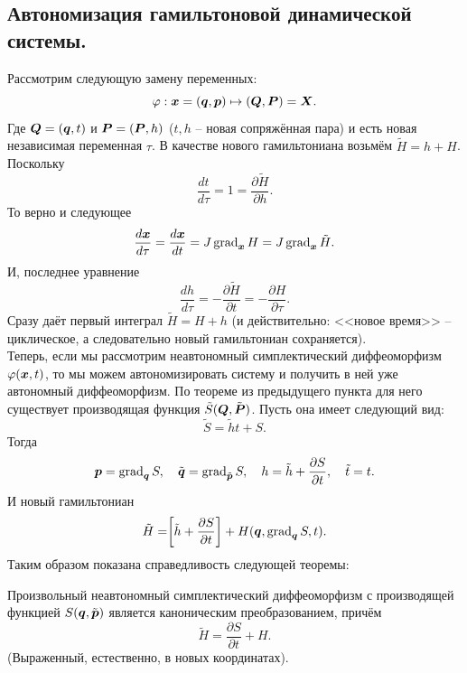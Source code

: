 \subsection{Автономизация гамильтоновой динамической системы.}
    Рассмотрим следующую замену переменных:
    \[
        \varphi: \boldsymbol{x} = (\boldsymbol{q}, \boldsymbol{p}) \mapsto (\boldsymbol{Q}, \boldsymbol{P}) = \boldsymbol{X}.
    \]
    Где $\boldsymbol{Q} = (\boldsymbol{q}, t)$ и $\boldsymbol{P} = (\boldsymbol{P}, h)$ ($t, h$ -- новая сопряжённая пара) и есть новая независимая переменная $\tau$.
    В качестве нового гамильтониана возьмём $\tilde{H} = h + H$.
    Поскольку
    \[
        \dfrac{dt}{d\tau} = 1 = \dfrac{\partial \tilde{H}}{\partial h}.
    \]
    То верно и следующее
    \[
        \dfrac{d \boldsymbol{x}}{d\tau} = \dfrac{d \boldsymbol{x}}{dt} = J\operatorname{grad}_{\boldsymbol{x}} H = J\operatorname{grad}_{\boldsymbol{x}} \tilde{H}.
    \]
    И, последнее уравнение
    \[
        \dfrac{d h}{d\tau} = - \dfrac{\partial \tilde{H}}{\partial t} = -\dfrac{\partial H}{\partial \tau}.
    \]
    Сразу даёт первый интеграл $\tilde{H} = H + h$ (и действительно: <<новое время>> -- циклическое, а следовательно новый гамильтониан сохраняется). \\
    Теперь, если мы рассмотрим неавтономный симплектический диффеоморфизм $\varphi(\boldsymbol{x}, t)$, то мы можем автономизировать систему и получить в ней уже автономный диффеоморфизм.
    По теореме из предыдущего пункта для него существует производящая функция $\tilde{S}(\boldsymbol{Q}, \tilde{\boldsymbol{P}})$.
    Пусть она имеет следующий вид:
   \[
        \tilde{S} = \tilde{h}t + S.
    \]
    Тогда
    \[
        \boldsymbol{p} = \operatorname{grad}_{\boldsymbol{q}} S, \quad \tilde{\boldsymbol{q}} = \operatorname{grad}_{\tilde{\boldsymbol{p}}} S, \quad h = \tilde{h} + \dfrac{\partial S}{\partial t}, \quad \tilde{t} = t.
    \]
    И новый гамильтониан
    \[
        \tilde{H} = \biggr[\tilde{h} + \dfrac{\partial S}{\partial t}\biggr] + H(\boldsymbol{q}, \operatorname{grad}_{\boldsymbol{q}} S, t).
    \]
    Таким образом показана справедливость следующей теоремы:
    \begin{theorem}
        Произвольный неавтономный симплектический диффеоморфизм с производящей функцией $S(\boldsymbol{q}, \tilde{\boldsymbol{p}})$ является каноническим преобразованием, причём
        \[
            \tilde{H} = \dfrac{\partial S}{\partial t} + H.
        \]
        (Выраженный, естественно, в новых координатах).
    \end{theorem}
